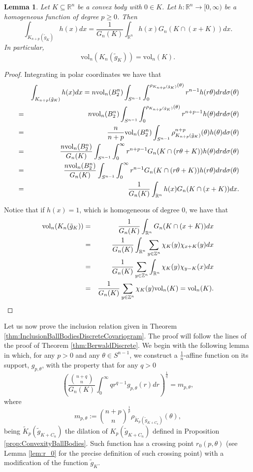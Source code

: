 \documentclass[10pt]{amsart}
\newtheorem{lemma}[thm]{Lemma}
\def\R{\mathbb{R}}
\def\Z{\mathbb{Z}}
\def\vol{\mathrm{vol}}
\numberwithin{equation}{section}
\begin{document}
\begin{lemma}\label{lem:Volume K_n(gK)}
Let $K\subseteq\R^n$ be a convex body with $0\in K$. Let $h:\R^n\to[0,\infty)$ be a homogeneous function of degree $p\geq0$. Then
$$
\int_{K_{n+p}(\tilde{g}_K)}h(x)dx=\frac{1}{G_n(K)}\int_{\R^n}h(x)G_n(K\cap(x+K))dx.
$$
In particular,
$$
\vol_n(K_n(\tilde{g}_K))=\vol_n(K).
$$
\end{lemma}
\begin{proof}
Integrating in polar coordinates we have that
\begin{eqnarray*}
&&\int_{K_{n+p}(\tilde{g}_K)}h(x)dx=n\vol_n(B_2^n)\int_{S^{n-1}}\int_0^{\rho_{K_{n+p}(\tilde{g}_K)}(\theta)}r^{n-1}h(r\theta)drd\sigma(\theta)\cr
&=&n\vol_n(B_2^n)\int_{S^{n-1}}\int_0^{\rho_{K_{n+p}(\tilde{g}_K)}(\theta)}r^{n+p-1}h(\theta)drd\sigma(\theta)\cr
&=&\frac{n}{n+p}\vol_n(B_2^n)\int_{S^{n-1}}\rho_{K_{n+p}(\tilde{g}_K)}^{n+p}(\theta)h(\theta)d\sigma(\theta)\cr
&=&\frac{n\vol_n(B_2^n)}{G_n(K)}\int_{S^{n-1}}\int_0^\infty r^{n+p-1}G_n(K\cap(r\theta+K))h(\theta)drd\sigma(\theta)\cr
&=&\frac{n\vol_n(B_2^n)}{G_n(K)}\int_{S^{n-1}}\int_0^\infty r^{n-1}G_n(K\cap(r\theta+K))h(r\theta)drd\sigma(\theta)\cr
&=&\frac{1}{G_n(K)}\int_{\R^n}h(x)G_n(K\cap(x+K))dx.
\end{eqnarray*}

Notice that if $h(x)=1$, which is homogeneous of degree $0$, we have that
\begin{eqnarray*}
\vol_n(K_n(\tilde{g}_K))&=&\frac{1}{G_n(K)}\int_{\R^n}G_n(K\cap(x+K))dx\cr
&=&\frac{1}{G_n(K)}\int_{\R^n}\sum_{y\in \Z^n}\chi_{K}(y)\chi_{x+K}(y)dx\cr
&=&\frac{1}{G_n(K)}\sum_{y\in \Z^n}\int_{\R^n}\chi_{K}(y)\chi_{y-K}(x)dx\cr
&=&\frac{1}{G_n(K)}\sum_{y\in \Z^n}\chi_{K}(y)\vol_n(K)=\vol_n(K).
\end{eqnarray*}
\end{proof}

Let us now prove the inclusion relation given in Theorem \ref{thm:InclusionBallBodiesDiscreteCovariogram}. The proof will follow the lines of the proof of Theorem \ref{thm:BerwaldDiscrete}. We begin with the following lemma in which, for any $p>0$ and any $\theta\in S^{n-1}$, we construct a $\frac{1}{n}$-affine function on its support, $g_{p,\theta}$, with the property that for any $q>0$
$$
\left(\frac{{{n+q}\choose{n}}}{G_n(K)}\int_0^\infty qr^{q-1}g_{p,\theta}(r)dr\right)^\frac{1}{q}=m_{p,\theta},
$$
where
$$
m_{p,\theta}:={{n+p}\choose{n}}^\frac{1}{p}\rho_{\tilde{K}_p(\tilde{g}_{K+C_n})}(\theta),
$$
being $\tilde{K}_p(\tilde{g}_{K+C_n})$ the dilation of $K_p(\tilde{g}_{K+C_n})$ defined in Proposition \ref{prop:ConvexityBallBodies}. Such function has a crossing point $r_0(p,\theta)$ (see Lemma \ref{lem:r_0} for the precise definition of such crossing point) with a modification of the function $\tilde{g}_K$.
\end{document}
